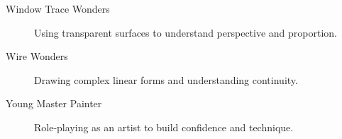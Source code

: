 \documentclass{article}
\begin{document}
\begin{description}
    \item[Window Trace Wonders] Using transparent surfaces to understand perspective and proportion.
    
    \item[Wire Wonders] Drawing complex linear forms and understanding continuity.
    
    \item[Young Master Painter] Role-playing as an artist to build confidence and technique.


    
\end{description}
\end{document}
